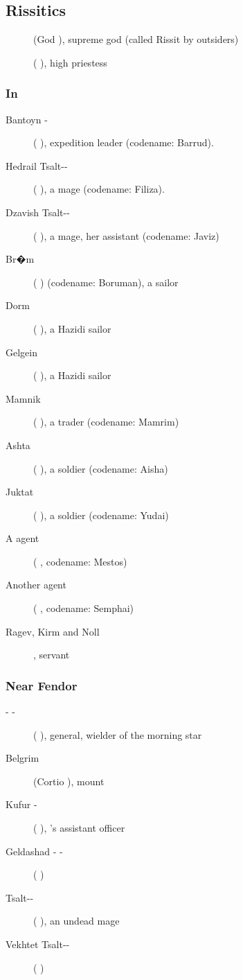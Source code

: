 \subsection{Rissitics}
\begin{description}
	\item[\HriistN] (God \Mars), supreme god (called Rissit by outsiders)
	\item[\TesHanith{} \TsaltNyzleth] (\scatha{} \Venus), high priestess
\end{description}
\subsubsection{In \FendorSmall}
\begin{description}
	\item[Bantoyn \Rekkan{}-\Ondmyst] (\scatha{} \Mars), expedition leader (codename: Barrud).
	\item[\Filgzed{} Hedrail Tsalt-\Sheshefkesad-\Ginfik] (\scatha{} \Venus), a mage (codename: Filiza).
	\item[Dzavish Tsalt-\Sheshefkesad-\Bryn] (\human{} \Venus), a mage, her assistant (codename: Javiz)
	\item[Br�m] (\scatha{} \Mars) (codename: Boruman), a sailor
	\item[Dorm] (\human{} \Mars), a Hazidi sailor
	\item[Gelgein] (\human{} \Mars), a Hazidi sailor
	\item[Mamnik] (\human{} \Mars), a trader (codename: Mamrim)
	\item[Ashta] (\scatha{} \Venus), a soldier (codename: Aisha)
	\item[Juktat] (\scatha{} \Mars), a soldier (codename: Yudai) 
	\item[A \Gisshorn{} agent] (\human{} \Mars, codename: Mestos)
	\item[Another \Gisshorn{} agent] (\human{} \Mars, codename: Semphai)
	\item[Ragev, Kirm and Noll], \Filgzedz{} servant
\end{description}
\subsubsection{Near Fendor}
\begin{description}
	\item[\Narkiza{} \Rekkan{}-\Neftzaid{} \Ashenoch-\Hashkfed] (\scatha{} \Mars), general, wielder of the morning star \Femtu{}
	\item[Belgrim] (Cortio \Mars), \Narkizaz{} mount
	\item[Kufur \Rekkan-\Ondmyst] (\scatha{} \Venus), \Narkiza's assistant officer
	\item[Geldashad \Rekkan{}-\Kozud{} \Ashenoch-\Fedza] (\human{} \Mars)
	\item[\Dasvedshiracht{} Tsalt-\Shesshefkesad-\Ryzeyd{} \UrrGammosh] (\dragon{} \Mars), an undead \dragon{} mage
	\item[Vekhtet Tsalt-\Shesshefkesad-\Kseinga]
	\item[\Dzeredz] (\human{} \Venus)
\end{description}




